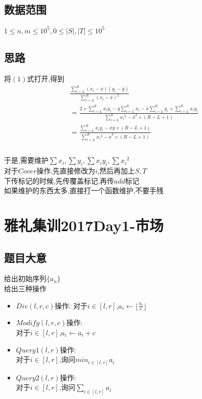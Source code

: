 \documentclass{ctexart}
\numberwithin{equation}{section}
\begin{document}
\begin{flushleft}
  \subsection{数据范围}
  $1\le n,m\le 10^5,0\leq|S|,|T|\leq 10^5$ \\
  \newpage
  
  \subsection{思路}
  将$(1)$式打开,得到 \\
  \begin{align*}
    &\frac{\sum_{i=L}^{R}(x_i-\bar{x})(y_i- \bar{y})}{\sum_{i=L}^{R}(x_i-\bar{x})^2}\\
    &= \frac{2\times\sum_{i=L}^{R}x_iy_i-\bar{y}\sum_{i=L}^{R}x_i-\bar{x}\sum_{i=L}^{R}y_i+\sum_{i=L}^{R}x_iy_i}{\sum_{i=L}^{R}{x_i}^2-\bar{x}^2\times(R-L+1)}\\
    &= \frac{\sum_{i=L}^{R}x_iy_i-\bar{x}\bar{y}\times(R-L+1)}{\sum_{i=L}^{R}{x_i}^2-\bar{x}^2\times(R-L+1)}\\
  \end{align*}
  ~\\
  于是,需要维护$\sum x_i,\sum y_i, \sum x_iy_i, \sum {x_i}^2$\\
  对于$Cover$操作,先直接修改为$i$,然后再加上$S,T$\\
  下传标记的时候,先传覆盖标记,再传$add$标记\\
  如果维护的东西太多,直接打一个函数维护,不要手残\\
  \newpage

  \section{雅礼集训2017Day1-市场 }
  \subsection{题目大意}
  给出初始序列$\{a_n\}$\\
  给出三种操作
  \begin{itemize}
  \item $Div(l,r,c)$操作:
    对于$i \in [l,r]$,$a_i\leftarrow \lfloor \frac{a_i}{c}\rfloor$ \\
  \item $Modify(l,r,c)$操作:\\
    对于$i\in [l,r]$,$a_i\leftarrow a_i+c$\\
  \item $Query1(l,r)$操作:　\\
    对于$i\in [l,r]$,询问$min_{i\in [l,r]}a_i$\\
  \item $Query2(l,r)$操作: \\
    对于$i\in [l,r]$,询问$\sum_{i\in [l,r]}a_i$\\
  \end{itemize}

\end{flushleft}
\end{document}
